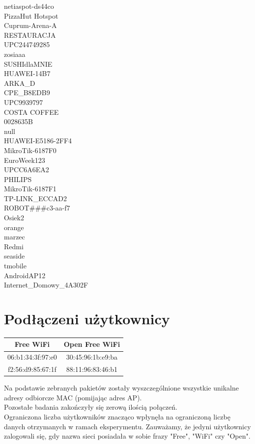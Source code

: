 \documentclass[12pt,a4paper]{article}
\begin{document}
\begin{small}
\begin{multicols}{3}
                netiaspot-ds44co\\PizzaHut Hotspot\\Cuprum-Arena-A\\RESTAURACJA\\UPC244749285\\zosiaaa\\SUSHIdlaMNIE\\
                HUAWEI-14B7\\ARKA\_D\\CPE\_B8EDB9\\UPC9939797\\COSTA COFFEE\\0028635B\\null\\HUAWEI-E5186-2FF4\\
                MikroTik-6187F0\\EuroWeek123\\UPCC6A6EA2\\PHILIPS\\MikroTik-6187F1\\TP-LINK\_ECCAD2\\
                ROBOT\#\#\#c3-aa-f7\\Osiek2\\orange\\marzec\\Redmi\\seaside\\tmobile\\AndroidAP12\\Internet\_Domowy\_4A302F\\
            \end{multicols}
        \end{small}

    \section{Podłączeni użytkownicy}
        \begin{center}
            \begin{tabular}{|c|c|}
                \hline
                Free WiFi & Open Free WiFi\\
                \hline
                06:b1:34:3f:97:e0 & 30:45:96:1b:e9:ba\\
                f2:56:d9:85:67:1f & 88:11:96:83:46:b1\\
                \hline
            \end{tabular}
        \end{center}
        Na podstawie zebranych pakietów zostały wyszczególnione wszystkie unikalne adresy odbiorcze MAC (pomijając adres AP).\\
        Pozostałe badania zakończyły się zerową ilością połączeń. \\
        Ograniczona liczba użytkowników znacząco wpłynęła na ograniczoną liczbę danych otrzymanych w ramach eksperymentu. Zauważamy, że jedyni użytkownicy zalogowali się, gdy nazwa sieci posiadała w sobie frazy "Free", "WiFi" czy "Open".
\end{document}
